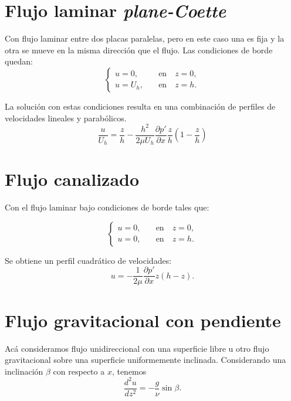 \documentclass[openany]{book}
\begin{document}
\section{Flujo laminar \textit{plane-Coette}}
Con flujo laminar entre dos placas paralelas, pero en este caso
una es fija y la otra se mueve en la misma dirección que el flujo.
Las condiciones de borde quedan:
\begin{equation}
    \begin{cases}
        u=0,&\quad \mathrm{en}\quad z=0,\\
        u=U_h,&\quad \mathrm{en}\quad z=h.
    \end{cases}
\end{equation}

\par La solución con estas condiciones resulta en una combinación
de perfiles de velocidades lineales y parabólicos.
\begin{equation}
    \frac{u}{U_h}=\frac{z}{h}-\frac{h^2}{2\mu U_h}\frac{\partial p'}{\partial x}\frac{z}{h}\left(1-\frac{z}{h}\right)
\end{equation}

\section{Flujo canalizado}
Con el flujo laminar bajo condiciones de borde tales que:

\begin{equation}
    \begin{cases}
        u=0,&\quad \mathrm{en}\quad z=0,\\
        u=0,&\quad \mathrm{en}\quad z=h.
    \end{cases}
\end{equation}

Se obtiene un perfil cuadrático de velocidades:
\begin{equation}
    u=-\frac1{2\mu}\frac{\partial p'}{\partial x}z(h-z).
\end{equation}

\section{Flujo gravitacional con pendiente}
Acá consideramos flujo unidireccional con una superficie libre 
u otro flujo gravitacional sobre una superficie uniformemente
inclinada. Considerando una inclinación $\beta$ con respecto a
$x$, tenemos
\begin{equation}
    \frac{d^2u}{dz^2}=-\frac{g}{\nu}\sin{\beta}.
\end{equation}
\end{document}
